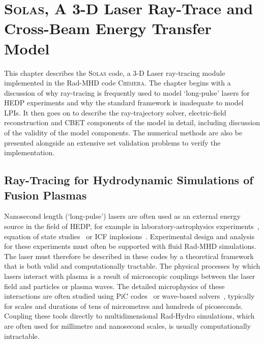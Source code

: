 \chapter{\textsc{Solas}, A 3-D Laser Ray-Trace and Cross-Beam Energy Transfer Model}%
\label{chap:SOLAS}

This chapter describes the \textsc{Solas} code, a 3-D Laser ray-tracing module implemented in the \ac{Rad-MHD} code \textsc{Chimera}.
The chapter begins with a discussion of why ray-tracing is frequently used to model `long-pulse' lasers for \ac{HEDP} experiments and why the standard framework is inadequate to model \ac{LPIs}.
It then goes on to describe the ray-trajectory solver, electric-field reconstruction and \ac{CBET} components of the model in detail, including discussion of the validity of the model components.
The numerical methods are also be presented alongside an extensive set validation problems to verify the implementation.

\newpage

\section{Ray-Tracing for Hydrodynamic Simulations of Fusion Plasmas}%
\label{sec:SOLAS_raytracing_for_ICF}

Nanosecond length (`long-pulse') lasers are often used as an external energy source in the field of \ac{HEDP}, for example in laboratory-astrophysics experiments~\cite{tzeferacos_laboratory_2018,fiuza_electron_2020,meinecke_strong_2022}, equation of state studies~\cite{kritcher_measurement_2020,smith_ramp_2014} or \ac{ICF} implosions~\cite{zylstra_burning_2022,slutz_high-gain_2012,williams_demonstration_2024}.
Experimental design and analysis for these experiments must often be supported with fluid \ac{Rad-MHD} simulations.
The laser must therefore be described in these codes by a theoretical framework that is both valid and computationally tractable.
The physical processes by which lasers interact with plasma is a result of microscopic couplings between the laser field and particles or plasma waves.
The detailed microphysics of these interactions are often studied using \ac{PiC} codes~\cite{nguyen_cross-beam_2021} or wave-based solvers~\cite{myatt_wave-based_2017}, typically for scales and durations of tens of micrometres and hundreds of picoseconds.
Coupling these tools directly to multidimensional \ac{Rad-Hydro} simulations, which are often used for millimetre and nanosecond scales, is usually computationally intractable.

